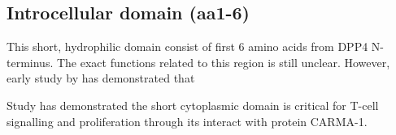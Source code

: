 \subsection{Introcellular domain (aa1-6)}

This short, hydrophilic domain consist of first 6 amino acids from DPP4 N-terminus. The exact functions related to this region is still unclear. However, early study by \citet{Hong1990}has demonstrated that 

Study has demonstrated the short cytoplasmic domain is critical for T-cell signalling and proliferation through its interact with protein CARMA-1. \cite{Ohnuma_2007}
